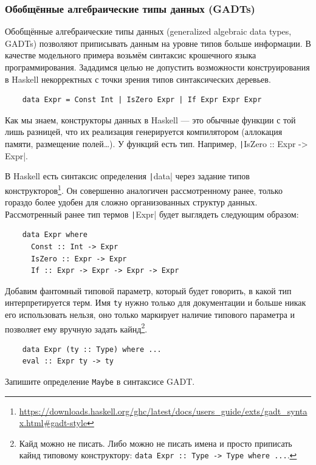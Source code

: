 \subsubsection{Обобщённые алгебраические типы данных (GADTs)}

Обобщённые алгебраические типы данных (generalized algebraic data types, GADTs) позволяют приписывать данным на уровне типов больше информации.
В качестве модельного примера возьмём синтаксис крошечного языка программирования.
Зададимся целью не допустить возможности конструирования в Haskell некорректных с точки зрения типов синтаксических деревьев.
\begin{verbatim}
    data Expr = Const Int | IsZero Expr | If Expr Expr Expr
\end{verbatim}

Как мы знаем, конструкторы данных в Haskell --- это обычные функции с той лишь разницей, что их реализация генерируется компилятором (аллокация памяти, размещение полей\ldots).
У функций есть тип.
Например, \texttt|IsZero :: Expr -> Expr|.

В Haskell есть синтаксис определения \texttt|data| через задание типов конструкторов\footnote{\url{https://downloads.haskell.org/ghc/latest/docs/users_guide/exts/gadt_syntax.html\#gadt-style}}.
Он совершенно аналогичен рассмотренному ранее, только гораздо более удобен для сложно организованных структур данных.
Рассмотренный ранее тип термов \texttt|Expr| будет выглядеть следующим образом:
\begin{verbatim}
    data Expr where
      Const :: Int -> Expr
      IsZero :: Expr -> Expr
      If :: Expr -> Expr -> Expr -> Expr
\end{verbatim}

Добавим фантомный типовой параметр, который будет говорить, в какой тип интерпретируется терм.
Имя \texttt{ty} нужно только для документации и больше никак его использовать нельзя, оно только маркирует наличие типового параметра и позволяет ему вручную задать кайнд\footnote{Кайд можно не писать. Либо можно не писать имена и просто приписать кайнд типовому конструктору: \texttt{data Expr :: Type -> Type where ...}.}.
\begin{verbatim}
    data Expr (ty :: Type) where ...
    eval :: Expr ty -> ty
\end{verbatim}

\begin{task}
    Запишите определение \texttt{Maybe} в синтаксисе GADT.
\end{task}

